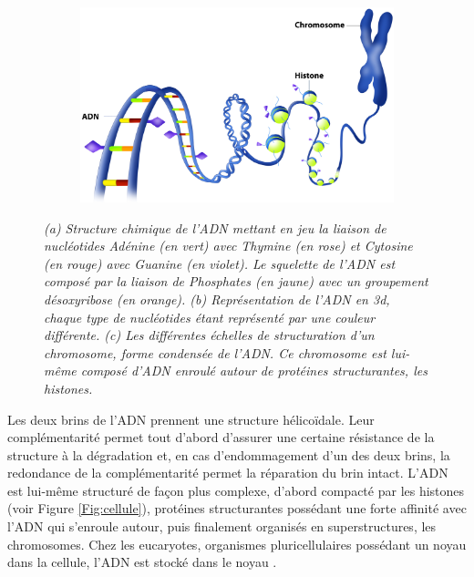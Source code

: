 \begin{figure}
\begin{subfigure}{.35\textwidth}
    \caption{}
    \label{Fig:dna_structure_3d}
  \hspace{0.2cm}
  \end{subfigure}
  \begin{subfigure}{\textwidth}
  \centering
  {\includegraphics[width=0.7\linewidth]{./figures/ch1/chromosome_adn_horizontal.pdf}}
    \caption{}
    \label{Fig:chromosome_adn_2}
  \end{subfigure}
  \caption{\it (a) Structure chimique de l'ADN mettant en jeu la liaison de nucléotides Adénine (en vert) avec Thymine (en rose) et Cytosine (en rouge) avec Guanine (en violet). Le squelette de l'ADN est composé par la liaison de Phosphates (en jaune) avec un groupement désoxyribose (en orange).
  (b) Représentation de l'ADN en 3d, chaque type de nucléotides étant représenté par une couleur différente.
  (c) Les différentes échelles de structuration d'un chromosome, forme condensée de l'ADN. Ce chromosome est lui-même composé d'ADN enroulé autour de protéines structurantes, les histones.}
\end{figure}

Les deux brins de l'ADN prennent une structure hélicoïdale. Leur complémentarité permet tout d'abord d'assurer une certaine résistance de la structure à la dégradation et, en cas d'endommagement d'un des deux brins, la redondance de la complémentarité permet la réparation du brin intact.
L'ADN est lui-même structuré de façon plus complexe, d'abord compacté par les histones (voir Figure \ref{Fig:cellule}), protéines structurantes possédant une forte affinité avec l'ADN qui s'enroule autour, puis finalement organisés en superstructures, les chromosomes. 
Chez les eucaryotes, organismes pluricellulaires possédant un noyau dans la cellule, l'ADN est stocké dans le noyau \cite{johnson2011biologie}. 




